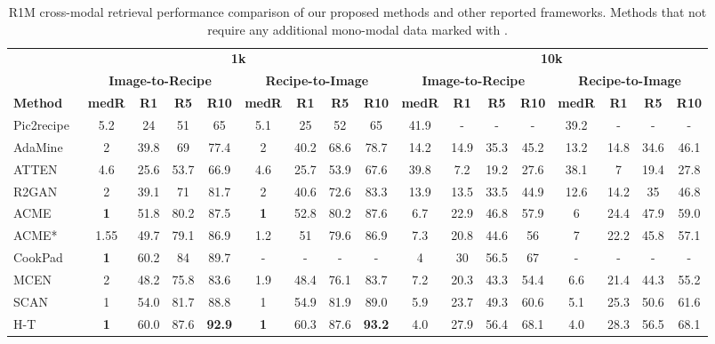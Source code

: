 \documentclass[sigconf,nonacm]{acmart}
\begin{document}
\begin{table*}[!ht]
\centering
  \small
  \caption{R1M cross-modal retrieval performance comparison of our proposed methods and other reported frameworks. Methods that not require any additional mono-modal data marked with .}
  \begin{tabular}{l|cccc|cccc|cccc|cccc}
\toprule
	 & \multicolumn{8}{c|}{\textbf{1k}} & \multicolumn{8}{c}{\textbf{10k}}    \\ \cmidrule{2-17}
	 & \multicolumn{4}{c|}{\textbf{Image-to-Recipe}} & \multicolumn{4}{c|}{\textbf{Recipe-to-Image}}& \multicolumn{4}{c|}{\textbf{Image-to-Recipe}} & \multicolumn{4}{c}{\textbf{Recipe-to-Image}}   \\  \cmidrule{1-17}
	\textbf{Method} & \textbf{medR} & \textbf{R1} & \textbf{R5} & \textbf{R10} & \textbf{medR} & \textbf{R1} & \textbf{R5} & \textbf{R10} & \textbf{medR} & \textbf{R1} & \textbf{R5} & \textbf{R10}& \textbf{medR} & \textbf{R1} & \textbf{R5} & \textbf{R10}  \\ 
	\midrule
	Pic2recipe~\cite{salvador2017} & 5.2 & 24 & 51 & 65 & 5.1 & 25 & 52 & 65 & 41.9 & - & - & - & 39.2 & - & - & -  \\ 
	AdaMine~\cite{carvalho2018} & 2 & 39.8 & 69 & 77.4 & 2 & 40.2 & 68.6 & 78.7 & 14.2 & 14.9 & 35.3 & 45.2 & 13.2 & 14.8 & 34.6 & 46.1 \\ 
	ATTEN~\cite{chen2018} & 4.6 & 25.6 & 53.7 & 66.9 & 4.6 & 25.7 & 53.9 & 67.6 & 39.8 & 7.2 & 19.2 & 27.6 & 38.1 & 7 & 19.4 & 27.8 \\ 
	R2GAN~\cite{Zhu2019} & 2 & 39.1 & 71 & 81.7 & 2 & 40.6 & 72.6 & 83.3 & 13.9 & 13.5 & 33.5 & 44.9 & 12.6 & 14.2 & 35 & 46.8 \\ 
	ACME~\cite{wang2019} & \textbf{1} & 51.8 & 80.2 & 87.5 & \textbf{1} & 52.8 & 80.2 & 87.6 & 6.7 & 22.9 & 46.8 & 57.9 & 6 & 24.4 & 47.9 & 59.0 \\ 
	ACME* & 1.55 & 49.7 & 79.1 & 86.9 & 1.2 & 51 & 79.6 & 86.9 & 7.3 & 20.8 & 44.6 & 56 & 7 & 22.2 & 45.8 & 57.1 \\ 
	CookPad~\cite{Fain2019} & \textbf{1} & 60.2 & 84 & 89.7 & - & - & - & - & 4 & 30 & 56.5 & 67 & - & - & - & - \\ 
	MCEN~\cite{Fu2020} & 2 & 48.2 & 75.8 & 83.6 & 1.9 & 48.4 & 76.1 & 83.7  & 7.2	& 20.3	& 43.3	& 54.4	& 6.6	& 21.4	& 44.3	& 55.2 \\ 
	SCAN~\cite{wang2020} & 1 & 54.0 & 81.7 & 88.8 & 1 & 54.9 & 81.9 & 89.0 & 5.9 & 23.7 & 49.3 & 60.6 & 5.1 & 25.3 & 50.6 & 61.6  \\ 
	H-T~\cite{salvador2021} & \textbf{1} & 60.0 & 87.6 & \textbf{92.9} &\textbf{1} & 60.3 & 87.6 & \textbf{93.2}  & 4.0	& 27.9	& 56.4	& 68.1	& 4.0	& 28.3	& 56.5	& 68.1 \\ \hline

\end{tabular}
\end{table*}
\end{document}
